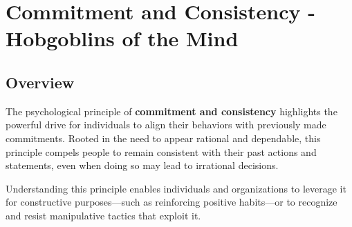 \section{Commitment and Consistency - Hobgoblins of the Mind}

\subsection*{Overview}
The psychological principle of \textbf{commitment and consistency} highlights the powerful drive for individuals to align their behaviors with previously made commitments. Rooted in the need to appear rational and dependable, this principle compels people to remain consistent with their past actions and statements, even when doing so may lead to irrational decisions.

Understanding this principle enables individuals and organizations to leverage it for constructive purposes—such as reinforcing positive habits—or to recognize and resist manipulative tactics that exploit it.


